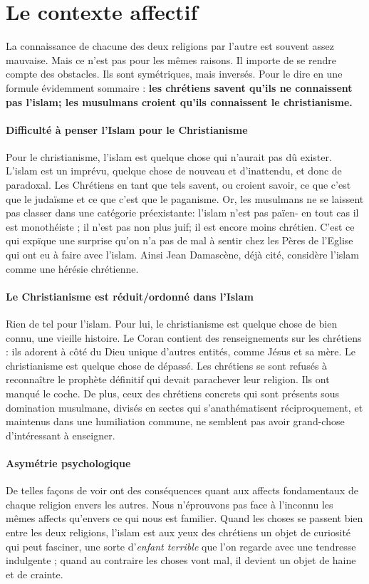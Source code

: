 \section{Le contexte affectif}

La connaissance de chacune des deux religions par l'autre est souvent assez mauvaise. Mais ce n'est pas pour les mêmes raisons. Il importe de se rendre compte des obstacles. Ils sont symétriques, mais inversés. Pour le dire en une formule évidemment sommaire : \textbf{les chrétiens savent qu'ils ne connaissent pas l'islam; les musulmans croient qu'ils connaissent le christianisme.}

\paragraph{Difficulté à penser l'Islam pour le Christianisme}
Pour le christianisme, l'islam est quelque chose qui n'aurait pas dû exister. L'islam est un imprévu, quelque chose de nouveau et d'inattendu, et donc de paradoxal. Les Chrétiens en tant que tels savent, ou croient savoir, ce que c'est que le judaïsme et ce que c'est que le paganisme. Or, les musulmans ne se laissent pas classer dans une catégorie préexistante: l'islam n'est pas païen- en tout cas il est monothéiste ; il n'est pas non plus juif; il est encore moins chrétien. C'est ce qui expïque une surprise qu'on n'a pas de mal à sentir chez les Pères de l'Eglise qui ont eu à faire avec l'islam. Ainsi Jean Damascène, déjà cité, considère l'islam comme une hérésie chrétienne.

\paragraph{Le Christianisme est réduit/ordonné dans l'Islam}
Rien de tel pour l'islam. Pour lui, le christianisme est quelque chose de bien connu, une vieille histoire. Le Coran contient des renseignements sur les chrétiens : ils adorent à côté du Dieu unique d'autres entités, comme Jésus et sa mère. Le christianisme est quelque chose de dépassé. Les chrétiens se sont refusés à reconnaître le prophète définitif qui devait parachever leur religion. Ils ont manqué le coche. De plus, ceux des chrétiens concrets qui sont présents sous domination musulmane, divisés en sectes qui s'anathématisent réciproquement, et maintenus dans une humiliation commune, ne semblent pas avoir grand-chose d'intéressant à enseigner.

\paragraph{Asymétrie psychologique}
De telles façons de voir ont des conséquences quant aux affects fondamentaux de chaque religion envers les autres. Nous n'éprouvons pas face à l'inconnu les mêmes affects qu'envers ce qui nous est familier. Quand les choses se passent bien entre les deux religions, l'islam est aux yeux des chrétiens un objet de curiosité qui peut fasciner, une sorte d'\textit{enfant terrible} que l'on regarde avec une tendresse indulgente ; quand au contraire les choses vont mal, il devient un objet de haine et de crainte.

